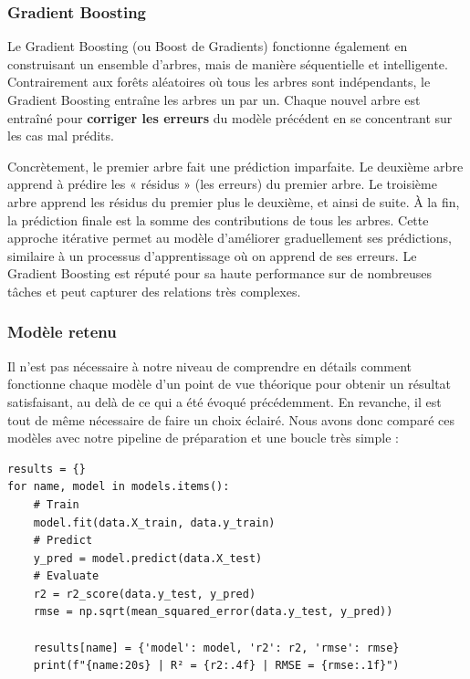 \documentclass[11pt,a4paper]{article}
\begin{document}
\clearpage
\subsubsection{Gradient Boosting}

Le Gradient Boosting (ou Boost de Gradients) fonctionne également en construisant un ensemble d'arbres, mais de manière séquentielle et intelligente. Contrairement aux forêts aléatoires où tous les arbres sont indépendants, le Gradient Boosting entraîne les arbres un par un. Chaque nouvel arbre est entraîné pour \textbf{corriger les erreurs} du modèle précédent en se concentrant sur les cas mal prédits.

Concrètement, le premier arbre fait une prédiction imparfaite. Le deuxième arbre apprend à prédire les « résidus » (les erreurs) du premier arbre. Le troisième arbre apprend les résidus du premier plus le deuxième, et ainsi de suite. À la fin, la prédiction finale est la somme des contributions de tous les arbres. Cette approche itérative permet au modèle d'améliorer graduellement ses prédictions, similaire à un processus d'apprentissage où on apprend de ses erreurs. Le Gradient Boosting est réputé pour sa haute performance sur de nombreuses tâches et peut capturer des relations très complexes.

\subsubsection{Modèle retenu}

Il n'est pas nécessaire à notre niveau de comprendre en détails comment fonctionne chaque modèle d'un point de vue théorique pour obtenir un résultat satisfaisant, au delà de ce qui a été évoqué précédemment. En revanche, il est tout de même nécessaire de faire un choix éclairé. Nous avons donc comparé ces modèles avec notre pipeline de préparation et une boucle très simple :

\begin{listing}[H]
\caption{Comparaison des modèles scikit-learn}
\label{lst:sklearn-comparison}
\begin{lstlisting}[style=pythonstyle]
results = {}
for name, model in models.items():
    # Train
    model.fit(data.X_train, data.y_train)
    # Predict
    y_pred = model.predict(data.X_test)
    # Evaluate
    r2 = r2_score(data.y_test, y_pred)
    rmse = np.sqrt(mean_squared_error(data.y_test, y_pred))

    results[name] = {'model': model, 'r2': r2, 'rmse': rmse}
    print(f"{name:20s} | R² = {r2:.4f} | RMSE = {rmse:.1f}")
\end{lstlisting}
\end{listing}
\end{document}
